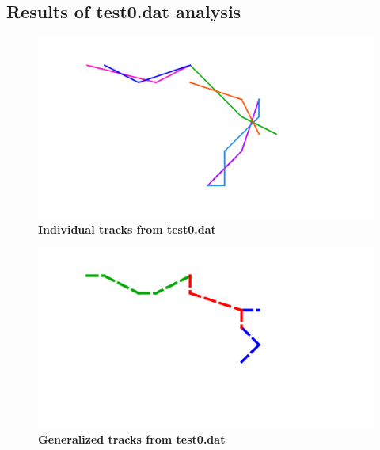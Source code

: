 \subsection{Results of test0.dat analysis}


\begin{figure}[!ht]
\begin{center}
 \includegraphics[scale=0.5]{./graphics/mst.png}
\end{center}
\caption{{\bf Individual tracks from test0.dat}}
\label{Figure1}
\end{figure}


\begin{figure}[!ht]
\begin{center}
 \includegraphics[scale=0.5]{./graphics/gtrack.png}
\end{center}
\caption{{\bf Generalized tracks from test0.dat}}
\label{Figure2}
\end{figure}

